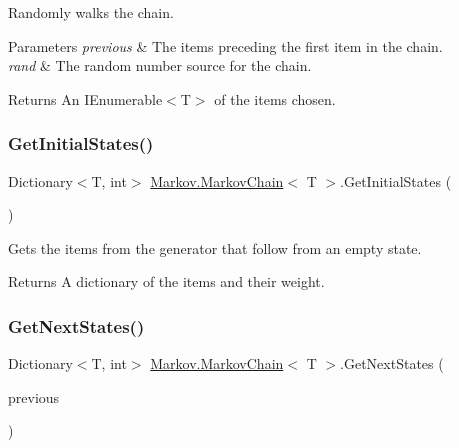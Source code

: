 Randomly walks the chain. 


\begin{DoxyParams}{Parameters}
{\em previous} & The items preceding the first item in the chain.\\
\hline
{\em rand} & The random number source for the chain.\\
\hline
\end{DoxyParams}
\begin{DoxyReturn}{Returns}
An I\+Enumerable$<$\+T$>$ of the items chosen.
\end{DoxyReturn}
\mbox{\label{class_markov_1_1_markov_chain_a5c19f54cdeff94bd0041fad4ba4c7c9e}} 
\subsubsection{\texorpdfstring{Get\+Initial\+States()}{GetInitialStates()}}
{\footnotesize\ttfamily Dictionary$<$T, int$>$ \mbox{\hyperlink{class_markov_1_1_markov_chain}{Markov.\+Markov\+Chain}}$<$ T $>$.Get\+Initial\+States (\begin{DoxyParamCaption}{ }\end{DoxyParamCaption})}



Gets the items from the generator that follow from an empty state. 

\begin{DoxyReturn}{Returns}
A dictionary of the items and their weight.
\end{DoxyReturn}
\mbox{\label{class_markov_1_1_markov_chain_aa9bf95df2986fff7d75c0c8489a0eab5}} 
\subsubsection{\texorpdfstring{Get\+Next\+States()}{GetNextStates()}\hspace{0.1cm}{\footnotesize\ttfamily [1/2]}}
{\footnotesize\ttfamily Dictionary$<$T, int$>$ \mbox{\hyperlink{class_markov_1_1_markov_chain}{Markov.\+Markov\+Chain}}$<$ T $>$.Get\+Next\+States (\begin{DoxyParamCaption}\item[{I\+Enumerable$<$ T $>$}]{previous }\end{DoxyParamCaption})}



